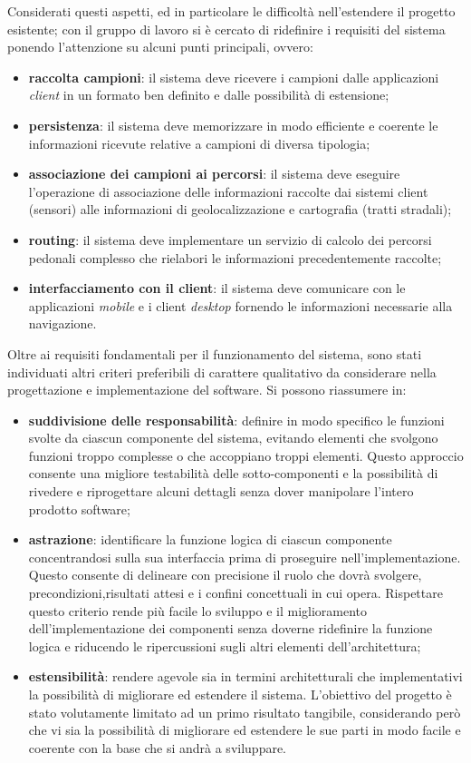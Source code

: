 Considerati questi aspetti, ed in particolare le difficoltà nell'estendere il progetto esistente;  con il gruppo di lavoro si è cercato di ridefinire i requisiti del sistema ponendo l'attenzione su alcuni punti principali, ovvero:
\begin{itemize}
\item \textbf{raccolta campioni}: il sistema deve ricevere i campioni dalle applicazioni \emph{client} in un formato ben definito e dalle possibilità di estensione;
\item \textbf{persistenza}: il sistema deve memorizzare in modo efficiente e coerente le informazioni ricevute relative a campioni di diversa tipologia;
\item \textbf{associazione dei campioni ai percorsi}: il sistema deve eseguire l'operazione di associazione delle informazioni raccolte dai sistemi client (sensori) alle informazioni di geolocalizzazione e cartografia (tratti stradali);
\item \textbf{routing}: il sistema deve implementare un servizio di calcolo dei percorsi pedonali complesso che rielabori le informazioni precedentemente raccolte;
\item \textbf{interfacciamento con il client}: il sistema deve comunicare con le applicazioni \emph{mobile}  e i client \emph{desktop} fornendo le informazioni necessarie alla navigazione.
\end{itemize}

Oltre ai requisiti fondamentali per il funzionamento del sistema, sono stati individuati altri criteri preferibili di carattere qualitativo da considerare nella progettazione e implementazione del software. Si possono riassumere in:
\begin{itemize}
\item \textbf{suddivisione delle responsabilità}: definire in modo specifico le funzioni svolte da ciascun componente del sistema, evitando elementi che svolgono funzioni troppo complesse o che accoppiano troppi elementi. Questo approccio consente una migliore testabilità delle sotto-componenti e la possibilità di rivedere e riprogettare alcuni dettagli senza dover manipolare l'intero prodotto software;
\item \textbf{astrazione}: identificare la funzione logica di ciascun componente concentrandosi sulla sua interfaccia prima di proseguire nell'implementazione. Questo consente di delineare con precisione il ruolo che dovrà svolgere, precondizioni,risultati attesi e i confini concettuali in cui opera. Rispettare questo criterio rende più facile lo sviluppo e il miglioramento dell'implementazione dei componenti senza doverne ridefinire la funzione logica e riducendo le ripercussioni sugli altri elementi dell'architettura;
\item \textbf{estensibilità}: rendere agevole sia in termini architetturali che implementativi la possibilità di migliorare ed estendere il sistema. L'obiettivo del progetto è stato volutamente limitato ad un primo risultato tangibile, considerando però che vi sia la possibilità di migliorare ed estendere le sue parti in modo facile e coerente con la base che si andrà a sviluppare.
\end{itemize}

